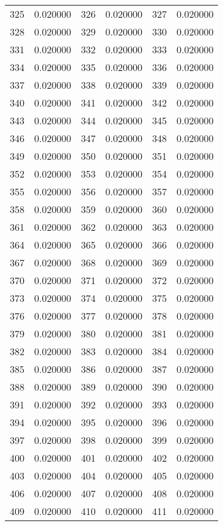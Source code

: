 \documentclass[12pt]{article}
\begin{document}
\begin{longtable}{@{}cc|cc|cc@{}}
325 & 0.020000 & 326 & 0.020000 & 327 & 0.020000 \\
328 & 0.020000 & 329 & 0.020000 & 330 & 0.020000 \\
331 & 0.020000 & 332 & 0.020000 & 333 & 0.020000 \\
334 & 0.020000 & 335 & 0.020000 & 336 & 0.020000 \\
337 & 0.020000 & 338 & 0.020000 & 339 & 0.020000 \\
340 & 0.020000 & 341 & 0.020000 & 342 & 0.020000 \\
343 & 0.020000 & 344 & 0.020000 & 345 & 0.020000 \\
346 & 0.020000 & 347 & 0.020000 & 348 & 0.020000 \\
349 & 0.020000 & 350 & 0.020000 & 351 & 0.020000 \\
352 & 0.020000 & 353 & 0.020000 & 354 & 0.020000 \\
355 & 0.020000 & 356 & 0.020000 & 357 & 0.020000 \\
358 & 0.020000 & 359 & 0.020000 & 360 & 0.020000 \\
361 & 0.020000 & 362 & 0.020000 & 363 & 0.020000 \\
364 & 0.020000 & 365 & 0.020000 & 366 & 0.020000 \\
367 & 0.020000 & 368 & 0.020000 & 369 & 0.020000 \\
370 & 0.020000 & 371 & 0.020000 & 372 & 0.020000 \\
373 & 0.020000 & 374 & 0.020000 & 375 & 0.020000 \\
376 & 0.020000 & 377 & 0.020000 & 378 & 0.020000 \\
379 & 0.020000 & 380 & 0.020000 & 381 & 0.020000 \\
382 & 0.020000 & 383 & 0.020000 & 384 & 0.020000 \\
385 & 0.020000 & 386 & 0.020000 & 387 & 0.020000 \\
388 & 0.020000 & 389 & 0.020000 & 390 & 0.020000 \\
391 & 0.020000 & 392 & 0.020000 & 393 & 0.020000 \\
394 & 0.020000 & 395 & 0.020000 & 396 & 0.020000 \\
397 & 0.020000 & 398 & 0.020000 & 399 & 0.020000 \\
400 & 0.020000 & 401 & 0.020000 & 402 & 0.020000 \\
403 & 0.020000 & 404 & 0.020000 & 405 & 0.020000 \\
406 & 0.020000 & 407 & 0.020000 & 408 & 0.020000 \\
409 & 0.020000 & 410 & 0.020000 & 411 & 0.020000 \\

\end{longtable}
\end{document}
